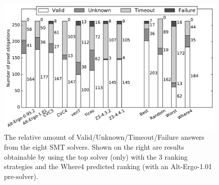 \documentclass[submission,copyright,creativecommons]{eptcs}
\begin{document}
\begin{figure}
	\centering
	\includegraphics[width=0.9\linewidth]{barcharts2}
	\caption{The relative amount of Valid/Unknown/Timeout/Failure answers from the eight SMT solvers. Shown on the right are results obtainable by using the top solver (only) with the 3 ranking strategies and the \textsf{Where4} predicted ranking (with an Alt-Ergo-1.01 pre-solver).}
	\label{fig:barchart2}
\end{figure}
\end{document}
